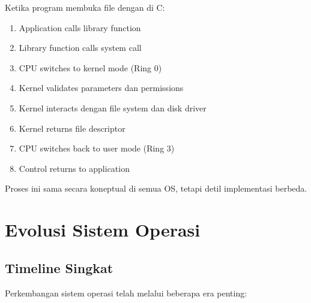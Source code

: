 \begin{examplebox}
Ketika program membuka file dengan  di C:

\begin{enumerate}
    \item Application calls library function 
    \item Library function calls system call 
    \item CPU switches to kernel mode (Ring 0)
    \item Kernel validates parameters dan permissions
    \item Kernel interacts dengan file system dan disk driver
    \item Kernel returns file descriptor
    \item CPU switches back to user mode (Ring 3)
    \item Control returns to application
\end{enumerate}

Proses ini sama secara koneptual di semua OS, tetapi detil implementasi berbeda.
\end{examplebox}


\section{Evolusi Sistem Operasi}
\label{sec:os-history}

\subsection{Timeline Singkat}

Perkembangan sistem operasi telah melalui beberapa era penting:

